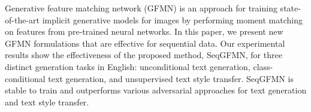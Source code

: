 Generative feature matching network (GFMN) is an approach for training state-of-the-art implicit generative models for images by performing moment matching on features from pre-trained neural networks. In this paper, we present new GFMN formulations that are effective for sequential data. Our experimental results show the effectiveness of the proposed method, SeqGFMN, for three distinct generation tasks in English: unconditional text generation, class-conditional text generation, and unsupervised text style transfer. SeqGFMN is stable to train and outperforms various adversarial approaches for text generation and text style transfer.
